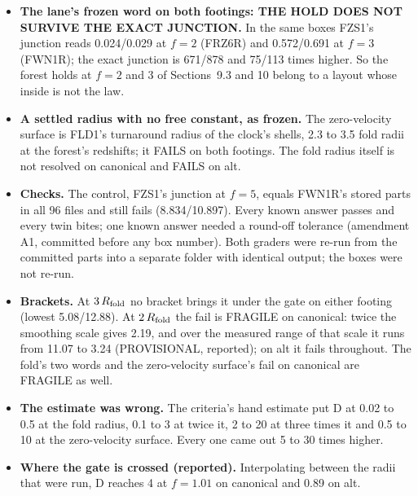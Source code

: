 \documentclass[10pt]{article}
\begin{document}
\begin{itemize}
\item \textbf{The lane's frozen word on both footings: THE HOLD DOES NOT SURVIVE THE EXACT JUNCTION.} In the same boxes FZS1's junction reads 0.024/0.029 at $f=2$ (FRZ6R) and 0.572/0.691 at $f=3$ (FWN1R); the exact junction is 671/878 and 75/113 times higher. So the forest holds at $f=2$ and 3 of Sections~9.3 and 10 belong to a layout whose inside is not the law.
\item \textbf{A settled radius with no free constant, as frozen.} The zero-velocity surface is FLD1's turnaround radius of the clock's shells, 2.3 to 3.5 fold radii at the forest's redshifts; it FAILS on both footings. The fold radius itself is not resolved on canonical and FAILS on alt.
\item \textbf{Checks.} The control, FZS1's junction at $f=5$, equals FWN1R's stored parts in all 96 files and still fails (8.834/10.897). Every known answer passes and every twin bites; one known answer needed a round-off tolerance (amendment A1, committed before any box number). Both graders were re-run from the committed parts into a separate folder with identical output; the boxes were not re-run.
\item \textbf{Brackets.} At $3\,R_{\rm fold}$ no bracket brings it under the gate on either footing (lowest 5.08/12.88). At $2\,R_{\rm fold}$ the fail is FRAGILE on canonical: twice the smoothing scale gives 2.19, and over the measured range of that scale it runs from 11.07 to 3.24 (PROVISIONAL, reported); on alt it fails throughout. The fold's two words and the zero-velocity surface's fail on canonical are FRAGILE as well.
\item \textbf{The estimate was wrong.} The criteria's hand estimate put D at 0.02 to 0.5 at the fold radius, 0.1 to 3 at twice it, 2 to 20 at three times it and 0.5 to 10 at the zero-velocity surface. Every one came out 5 to 30 times higher.
\item \textbf{Where the gate is crossed (reported).} Interpolating between the radii that were run, D reaches 4 at $f=1.01$ on canonical and 0.89 on alt.
\end{itemize}
\end{document}

